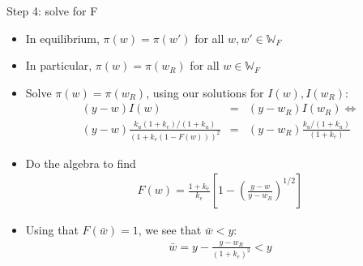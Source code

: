 \documentclass[9pt]{beamer}
\newcommand{\bit}{\begin{itemize}}
\newcommand{\eit}{\end{itemize}}
\begin{document}
\begin{frame}{Step 4: solve for F}

\bit
\setlength\itemsep{1.5em}

\item In equilibrium, $\pi(w) = \pi(w')$ for all $w, w' \in \mathbb{W}_F$

\item In particular, $\pi(w) = \pi(w_R)$ for all $w \in \mathbb{W}_F$

\item Solve $\pi(w) = \pi(w_R)$, using our solutions for $I(w), I(w_R)$:
\begin{eqnarray}
(y-w)I(w) &=& (y-w_R)I(w_R) \Leftrightarrow \nonumber \\
(y-w)\frac{k_u (1+k_e)/(1+k_u)}{(1+k_e(1-F(w)))^2} &=& (y-w_R) \frac{k_u /(1+k_u)}{(1+k_e)} \nonumber
\end{eqnarray}
\item Do the algebra to find
\begin{eqnarray}
F(w) = \frac{1+k_e}{k_e} \left[1-\left(\frac{y-w}{y-w_R}\right)^{1/2}\right]
\end{eqnarray}

\item Using that $F(\bar w) = 1$, we see that $\bar w<y$:
\begin{eqnarray}
\bar w = y - \frac{y-w_R}{(1+k_e)^2}<y
\end{eqnarray}

\eit

\end{frame}
\end{document}
